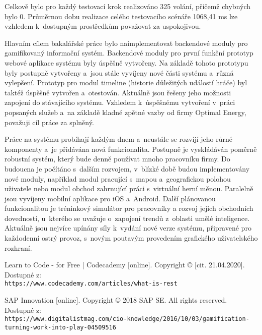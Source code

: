 \documentclass[twoside, 12pt]{article}
\begin{document}
{{Celkově bylo pro každý testovací krok realizováno 325 volání, přičemž chybných bylo 0.
Průměrnou dobu realizace celého testovacího scénáře 1068,41 ms lze vzhledem k~dostupným prostředkům
považovat za uspokojivou.

Hlavním cílem bakalářské práce bylo naimplementovat backendové moduly pro gamifikovaný informační systém.
Backendové moduly pro první funkční prototyp webové aplikace systému byly
úspěšně vytvořeny.
Na základě tohoto prototypu byly postupně vytvořeny
a~jsou stále vyvíjeny nové části systému a~různá vylepšení.
Prototyp pro modul timeline (historie důležitých událostí hráče) byl taktéž úspěšně vytvořen
a~otestován. Aktuálně jsou řešeny jeho možnosti zapojení do stávajícího systému.
Vzhledem k~úspěšnému vytvoření v~práci popsaných služeb a~na základě kladné zpětné vazby od firmy Optimal Energy,
považuji cíl práce za splněný.


Práce na systému probíhají každým dnem a~neustále se rozvíjí jeho růrné komponenty a~je přidávána nová funkcionalita.
Postupně je vyskládáván poměrně robustní systém, který bude denně používat mnoho pracovníku firmy.
Do budoucna je počítáno s~dalším rozvojem, v~blízké době budou implementovány nové moduly,
například modul pracující s~mapou a~geografickou polohou uživatele nebo modul obchod zahrnující práci s~virtuální herní měnou.
Paralelně jsou vyvíjeny mobilní aplikace pro iOS a~Android.
Další plánovanou funkcionalitou je tréninkový simulátor pro pracovníky a rozvoj jejich obchodních dovedností,
u~kterého se uvažuje o~zapojení trendů z~oblasti umělé inteligence.
Aktuálně jsou nejvíce upínány síly k~vydání nové verze systému, připravené pro každodenní ostrý provoz,
s~novým poutavým provedením grafického uživatelského rozhraní.


\begin{literatura}

{
 Learn to Code - for Free | Codecademy [online].
Copyright © [cit. 21.04.2020].
Dostupné z:
\\
\texttt{https://www.codecademy.com/articles/what-is-rest}
}

{
SAP Innovation [online]. Copyright © 2018 SAP SE. All rights reserved.
Dostupné z:
\\
\texttt{https://www.digitalistmag.com/cio-knowledge/2016/10/03/gamification-turning-work-into-play-04509516}
}


\end{literatura}}}
\end{document}
